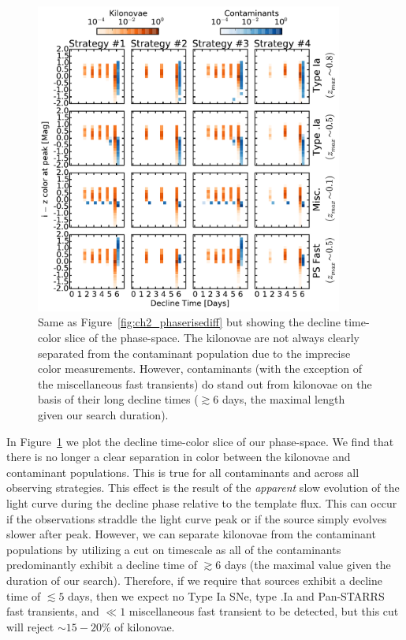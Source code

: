 \begin{figure}[t!]
\centering
\includegraphics[width=0.9\textwidth]{./figs/chapter2/ch2_f16.pdf}
\caption{Same as Figure~\ref{fig:ch2_phaserisediff} but showing the decline time-color slice of the phase-space. The kilonovae are not always clearly separated from the contaminant population due to the imprecise color measurements. However, contaminants (with the exception of the miscellaneous fast transients) do stand out from kilonovae on the basis of their long decline times ($\gtrsim 6$ days, the maximal length given our search duration).}
\label{fig:ch2_phasedecdiff}
\end{figure}

In Figure~\ref{fig:ch2_phasedecdiff} we plot the decline time-color slice of our phase-space. We find that there is no longer a clear separation in color between the kilonovae and contaminant populations. This is true for all contaminants and across all observing strategies. This effect is the result of the {\em apparent} slow evolution of the light curve during the decline phase relative to the template flux. This can occur if the observations straddle the light curve peak or if the source simply evolves slower after peak. However, we can separate kilonovae from the contaminant populations by utilizing a cut on timescale as all of the contaminants predominantly exhibit a decline time of $\gtrsim 6$ days (the maximal value given the duration of our search). Therefore, if we require that sources exhibit a decline time of $\lesssim 5$ days, then we expect no Type Ia SNe, type .Ia and Pan-STARRS fast transients, and $\ll 1$ miscellaneous fast transient to be detected, but this cut will reject $\sim15-20\%$ of kilonovae.

